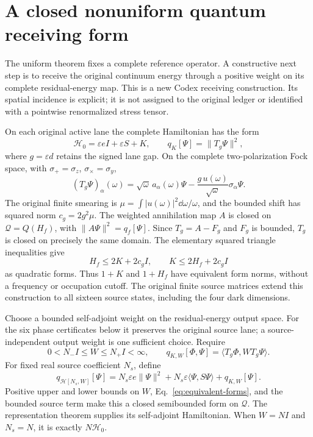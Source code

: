 \section{A closed nonuniform quantum receiving form}\label{sec:nonuniform}
The uniform theorem fixes a complete reference operator. A constructive next step is to receive the original continuum energy through a positive weight on its complete residual-energy map. This is a new Codex receiving construction. Its spatial incidence is explicit; it is not assigned to the original ledger or identified with a pointwise renormalized stress tensor.

On each original active lane the complete Hamiltonian has the form
\[
 \mathcal H_0=\varepsilon eI+\varepsilon S+K,\qquad
 q_K[\Psi]=\|T_g\Psi\|^2,
\]
where $g=\varepsilon d$ retains the signed lane gap. On the complete two-polarization Fock space, with $\sigma_+=\sigma_z$, $\sigma_\times=\sigma_y$,
\[
 (T_g\Psi)_\alpha(\omega)=\sqrt\omega\,a_\alpha(\omega)\Psi
 -\frac{g\,u(\omega)}{\sqrt\omega}\sigma_\alpha\Psi.
\]
The original finite smearing is $\mu=\int|u(\omega)|^2\dd\omega/\omega$, and the bounded shift has squared norm $c_g=2g^2\mu$. The weighted annihilation map $A$ is closed on $\mathcal Q=Q(H_f)$, with $\|A\Psi\|^2=q_f[\Psi]$. Since $T_g=A-F_g$ and $F_g$ is bounded, $T_g$ is closed on precisely the same domain. The elementary squared triangle inequalities give
\begin{equation}
 H_f\le2K+2c_gI,\qquad K\le2H_f+2c_gI
 \label{eq:equivalent-forms}
\end{equation}
as quadratic forms. Thus $1+K$ and $1+H_f$ have equivalent form norms, without a frequency or occupation cutoff. The original finite source matrices extend this construction to all sixteen source states, including the four dark dimensions.

Choose a bounded self-adjoint weight on the residual-energy output space. For the six phase certificates below it preserves the original source lane; a source-independent output weight is one sufficient choice. Require
\[
 0<N_-I\le W\le N_+I<\infty,
 \qquad q_{K,W}[\Phi,\Psi]=\langle T_g\Phi,WT_g\Psi\rangle.
\]
For fixed real source coefficient $N_s$, define
\[
 q_{\mathcal H[N_s,W]}[\Psi]
 =N_s\varepsilon e\|\Psi\|^2+N_s\varepsilon\langle\Psi,S\Psi\rangle
 +q_{K,W}[\Psi].
\]
Positive upper and lower bounds on $W$, Eq.~\eqref{eq:equivalent-forms}, and the bounded source term make this a closed semibounded form on $\mathcal Q$. The representation theorem supplies its self-adjoint Hamiltonian. When $W=NI$ and $N_s=N$, it is exactly $N\mathcal H_0$.

